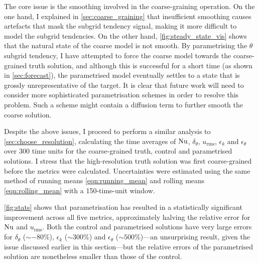 \documentclass[../main.tex]{subfiles}
\begin{document}
The core issue is the smoothing involved in the coarse-graining operation. On
the one hand, I explained in \cref{sec:coarse_graining} that insufficient
smoothing causes artefacts that mask the subgrid tendency signal, making it
more difficult to model the subgrid tendencies. On the other hand,
\cref{fig:steady_state_vis} shows that the natural state of the coarse model is
not smooth. By parametrising the $\theta$ subgrid tendency, I have attempted to
force the coarse model towards the coarse-grained truth solution, and although
this is successful for a short time (as shown in \cref{sec:forecast}), the
parametrised model eventually settles to a state that is grossly
unrepresentative of the target. It is clear that future work will need to
consider more sophisticated parametrisation schemes in order to resolve this
problem. Such a scheme might contain a diffusion term to further smooth
the coarse solution.

Despite the above issues, I proceed to perform a similar analysis to
\cref{sec:choose_resolution}, calculating the time averages of $\mathrm{Nu}$,
$\delta_\theta$, $u_\mathrm{rms}$, $\epsilon_k$ and $\epsilon_\theta$ over 300
time units for the coarse-grained truth, control and parametrised solutions. I
stress that the high-resolution truth solution was first coarse-grained before
the metrics were calculated. Uncertainties were estimated using the same method
of running means \cref{eqn:running_mean} and rolling means
\cref{eqn:rolling_mean} with a 150-time-unit window.

\cref{fig:stats} shows that parametrisation has resulted in a statistically
significant improvement across all five metrics, approximately halving the
relative error for $\mathrm{Nu}$ and $u_\mathrm{rms}$. Both the control and
parametrised solutions have very large errors for $\delta_\theta$ ($\sim -80
\%$), $\epsilon_k$ ($\sim 300 \%$) and $\epsilon_\theta$ ($\sim 500 \%$)---an
unsurprising result, given the issue discussed earlier in this section---but
the relative errors of the parametrised solution are nonetheless smaller than
those of the control.
\end{document}
